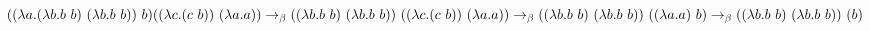 \documentclass{article}
\begin{document}
\large
\noindent
$
((\lambda a.(\lambda b.b\ b)\ (\lambda b.b\ b))\ b) ((\lambda c.(c\ b))\ (\lambda a.a)) \rightarrow_\beta \\
((\lambda b.b\ b)\ (\lambda b.b\ b))\ ((\lambda c.(c\ b))\ (\lambda a.a)) \rightarrow_\beta \\
((\lambda b.b\ b)\ (\lambda b.b\ b))\ ((\lambda a.a)\ b) \rightarrow_\beta \\
((\lambda b.b\ b)\ (\lambda b.b\ b))\ (b)
$
\end{document}
